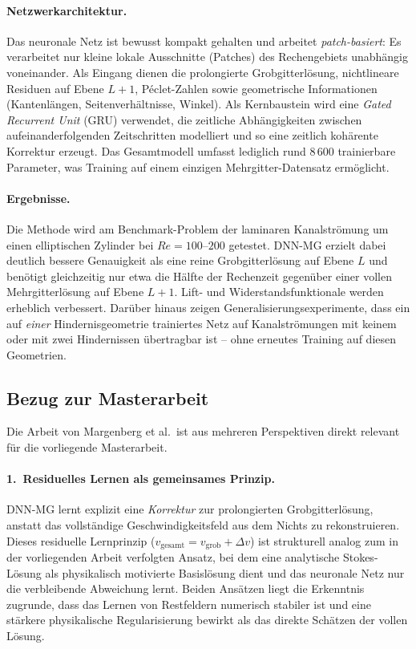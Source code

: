 \documentclass[a4paper,12pt]{article}
\begin{document}
\paragraph{Netzwerkarchitektur.}
Das neuronale Netz ist bewusst kompakt gehalten und arbeitet
\emph{patch-basiert}: Es verarbeitet nur kleine lokale Ausschnitte
(Patches) des Rechengebiets unabhängig voneinander. Als Eingang dienen die
prolongierte Grobgitterlösung, nichtlineare Residuen auf Ebene $L+1$,
Péclet-Zahlen sowie geometrische Informationen (Kantenlängen, Seitenverhältnisse,
Winkel). Als Kernbaustein wird eine \emph{Gated Recurrent Unit} (GRU) verwendet,
die zeitliche Abhängigkeiten zwischen aufeinanderfolgenden Zeitschritten
modelliert und so eine zeitlich kohärente Korrektur erzeugt. Das Gesamtmodell
umfasst lediglich rund 8\,600 trainierbare Parameter, was Training auf einem
einzigen Mehrgitter-Datensatz ermöglicht.

\paragraph{Ergebnisse.}
Die Methode wird am Benchmark-Problem der laminaren Kanalströmung um einen
elliptischen Zylinder bei $Re = 100$--$200$ getestet. DNN-MG erzielt dabei
deutlich bessere Genauigkeit als eine reine Grobgitterlösung auf Ebene $L$ und
benötigt gleichzeitig nur etwa die Hälfte der Rechenzeit gegenüber einer vollen
Mehrgitterlösung auf Ebene $L+1$. Lift- und Widerstandsfunktionale werden
erheblich verbessert. Darüber hinaus zeigen Generalisierungsexperimente, dass
ein auf \emph{einer} Hindernisgeometrie trainiertes Netz auf Kanalströmungen mit
keinem oder mit zwei Hindernissen übertragbar ist -- ohne erneutes Training
auf diesen Geometrien.

\subsection*{Bezug zur Masterarbeit}

Die Arbeit von Margenberg et al.\ ist aus mehreren Perspektiven direkt relevant
für die vorliegende Masterarbeit.

\paragraph{1.\ Residuelles Lernen als gemeinsames Prinzip.}
DNN-MG lernt explizit eine \emph{Korrektur} zur prolongierten Grobgitterlösung,
anstatt das vollständige Geschwindigkeitsfeld aus dem Nichts zu rekonstruieren.
Dieses residuelle Lernprinzip ($v_\text{gesamt} = v_\text{grob} + \Delta v$)
ist strukturell analog zum in der vorliegenden Arbeit verfolgten Ansatz, bei
dem eine analytische Stokes-Lösung als physikalisch motivierte Basislösung
dient und das neuronale Netz nur die verbleibende Abweichung lernt.
Beiden Ansätzen liegt die Erkenntnis zugrunde, dass das Lernen von
Restfeldern numerisch stabiler ist und eine stärkere physikalische
Regularisierung bewirkt als das direkte Schätzen der vollen Lösung.
\end{document}
